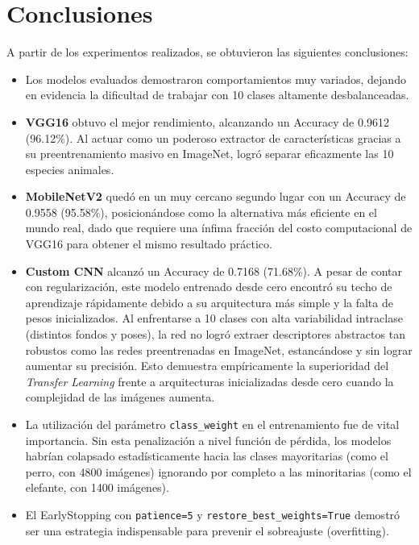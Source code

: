\documentclass[1p,12pt]{elsarticle}
\begin{document}
\section{Conclusiones}
\label{sec:conclusiones}

A partir de los experimentos realizados, se obtuvieron las siguientes
conclusiones:

\begin{itemize}
    \item Los modelos evaluados demostraron comportamientos muy variados,
          dejando en evidencia la dificultad de trabajar con 10 clases altamente
          desbalanceadas.

    \item \textbf{VGG16} obtuvo el mejor rendimiento, alcanzando un Accuracy de
          0.9612 (96.12\%). Al actuar como un poderoso extractor de
          características gracias a su preentrenamiento masivo en ImageNet,
          logró separar eficazmente las 10 especies animales.

    \item \textbf{MobileNetV2} quedó en un muy cercano segundo lugar con un
          Accuracy de 0.9558 (95.58\%), posicionándose como la alternativa más
          eficiente en el mundo real, dado que requiere una ínfima fracción del
          costo computacional de VGG16 para obtener el mismo resultado práctico.

    \item \textbf{Custom CNN} alcanzó un Accuracy de 0.7168 (71.68\%). A
          pesar de contar con regularización, este modelo entrenado desde cero
          encontró su techo de aprendizaje rápidamente debido a su arquitectura
          más simple y la falta de pesos inicializados. Al enfrentarse a 10
          clases con alta variabilidad intraclase (distintos fondos y poses),
          la red no logró extraer descriptores abstractos tan robustos como las
          redes preentrenadas en ImageNet, estancándose y sin lograr aumentar su
          precisión. Esto demuestra empíricamente la superioridad del
          \textit{Transfer Learning} frente a arquitecturas inicializadas desde
          cero cuando la complejidad de las imágenes aumenta.

    \item La utilización del parámetro \texttt{class\_weight} en el
          entrenamiento fue de vital importancia. Sin esta penalización a nivel
          función de pérdida, los modelos habrían colapsado estadísticamente
          hacia las clases mayoritarias (como el perro, con 4800 imágenes)
          ignorando por completo a las minoritarias (como el elefante, con 1400
          imágenes).

    \item El EarlyStopping con \texttt{patience=5} y
          \texttt{restore\_best\_weights=True} demostró ser una estrategia
          indispensable para prevenir el sobreajuste (overfitting).
\end{itemize}



\end{document}
